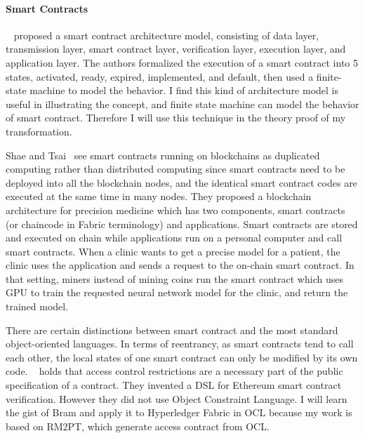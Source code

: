 \paragraph*{Smart Contracts}

~\cite{yang2020implementation} proposed a smart contract architecture model, consisting of data layer, transmission layer, smart contract layer, verification layer, execution layer, and application layer. The authors formalized the execution of a smart contract into 5 states, activated, ready, expired, implemented, and default, then used a finite-state machine to model the behavior.
I find this kind of architecture model is useful in illustrating the concept, and finite state machine can model the behavior of smart contract. Therefore I will use this technique in the theory proof of my transformation.

Shae and Tsai~\cite{shae2018transform} see smart contracts running on blockchains as duplicated computing rather than distributed computing
since smart contracts need to be deployed into all the blockchain nodes, and the identical smart contract codes are executed at the same time in many nodes.
They proposed a blockchain architecture for precision medicine which has two components, smart contracts (or chaincode in Fabric terminology) and applications.
Smart contracts are stored and executed on chain while applications run on a personal computer and call smart contracts.
When a clinic wants to get a precise model for a patient, the clinic uses the application and sends a request to the on-chain smart contract. In that setting, miners instead of mining coins run the smart contract which uses GPU to train the requested neural network model for the clinic, and return the trained model.


There are certain distinctions between smart contract and the most standard object-oriented languages. In terms of reentrancy, as smart contracts tend to call each other, the local states of one smart contract can only be modified by its own code.
~\cite{bram2021rich} holds that access control restrictions are a necessary part of the public specification of a contract. They invented a DSL for Ethereum smart contract verification. However they did not use Object Constraint Language.
I will learn the gist of Bram and apply it to Hyperledger Fabric in OCL because my work is based on RM2PT, which generate access contract from OCL.


